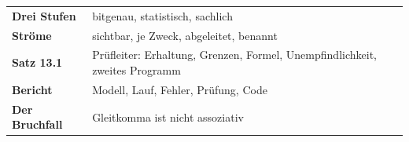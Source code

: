 \begin{merksatz}
\begin{center}
\renewcommand{\arraystretch}{1.5}
\begin{tabular}{@{}P{3.0cm}P{5.6cm}@{}}
\toprule
\textbf{Drei Stufen} & bitgenau, statistisch, sachlich\\
\textbf{Ströme} & sichtbar, je Zweck, abgeleitet, benannt\\
\textbf{Satz 13.1} & Prüfleiter: Erhaltung, Grenzen, Formel, Unempfindlichkeit, zweites Programm\\
\textbf{Bericht} & Modell, Lauf, Fehler, Prüfung, Code\\
\textbf{Der Bruchfall} & Gleitkomma ist nicht assoziativ\\
\bottomrule
\end{tabular}
\end{center}

\begin{center}
\begin{minipage}{0.88\textwidth}
\end{minipage}
\end{center}
\end{merksatz}

